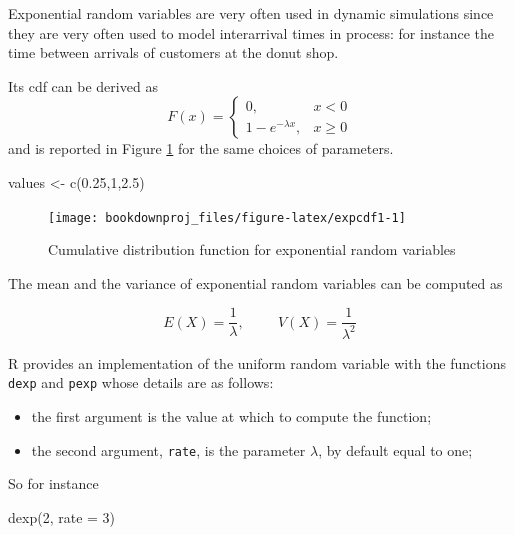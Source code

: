 \documentclass[
]{book}
\newenvironment{Shaded}{\begin{snugshade}}{\end{snugshade}}
\newcommand{\AttributeTok}[1]{\textcolor[rgb]{0.77,0.63,0.00}{#1}}
\newcommand{\DecValTok}[1]{\textcolor[rgb]{0.00,0.00,0.81}{#1}}
\newcommand{\FloatTok}[1]{\textcolor[rgb]{0.00,0.00,0.81}{#1}}
\newcommand{\FunctionTok}[1]{\textcolor[rgb]{0.00,0.00,0.00}{#1}}
\newcommand{\NormalTok}[1]{#1}
\newcommand{\OtherTok}[1]{\textcolor[rgb]{0.56,0.35,0.01}{#1}}
\theoremstyle{definition}
\theoremstyle{definition}
\theoremstyle{definition}
\theoremstyle{definition}
\theoremstyle{remark}
\begin{document}
Exponential random variables are very often used in dynamic simulations since they are very often used to model interarrival times in process: for instance the time between arrivals of customers at the donut shop.

Its cdf can be derived as
\[
F(x)=\left\{
\begin{array}{ll}
0, & x <0\\
1-e^{-\lambda x}, & x\geq 0
\end{array}
\right.
\]
and is reported in Figure \ref{fig:expcdf1} for the same choices of parameters.

\begin{Shaded}
\begin{Highlighting}[]
\NormalTok{values }\OtherTok{\textless{}{-}} \FunctionTok{c}\NormalTok{(}\FloatTok{0.25}\NormalTok{,}\DecValTok{1}\NormalTok{,}\FloatTok{2.5}\NormalTok{)}
\end{Highlighting}
\end{Shaded}

\begin{figure}

{\centering \texttt{[image: bookdownproj\_files/figure-latex/expcdf1-1]} 

}

\caption{Cumulative distribution function for exponential random variables}\label{fig:expcdf1}
\end{figure}

The mean and the variance of exponential random variables can be computed as

\[
E(X)=\frac{1}{\lambda}, \hspace{1cm} V(X)=\frac{1}{\lambda^2}
\]

R provides an implementation of the uniform random variable with the functions \texttt{dexp} and \texttt{pexp} whose details are as follows:

\begin{itemize}
\item
  the first argument is the value at which to compute the function;
\item
  the second argument, \texttt{rate}, is the parameter \(\lambda\), by default equal to one;
\end{itemize}

So for instance

\begin{Shaded}
\begin{Highlighting}[]
\FunctionTok{dexp}\NormalTok{(}\DecValTok{2}\NormalTok{, }\AttributeTok{rate =} \DecValTok{3}\NormalTok{)}
\end{Highlighting}
\end{Shaded}
\end{document}
